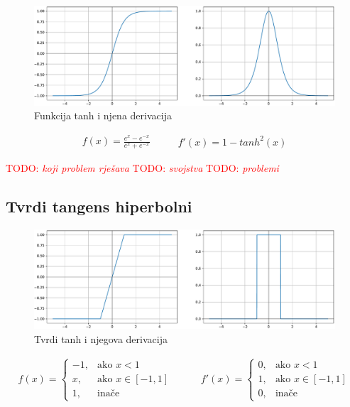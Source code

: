 \documentclass[times, utf8, diplomski]{fer}
\def\TODO#1{\noindent\textcolor{red}{TODO: \textit{#1}}\newline}
\def\todo#1{\TODO{#1}}
\begin{document}
\begin{figure}[H]
\includegraphics[width=\textwidth]{tanh.pdf}
\centering
\caption{Funkcija tanh i njena derivacija}
\label{fig:tanh}
\end{figure}

\begin{equation}
\begin{split}
f(x) = \frac{e^x - e^{-x}}{e^x + e^{-x}}
\end{split}
\qquad
\begin{split}
f'(x) = 1 - tanh^2(x)
\end{split}
\end{equation}

\todo{koji problem rješava}
\todo{svojstva}
\todo{problemi}

\subsection{Tvrdi tangens hiperbolni}

\begin{figure}[H]
\includegraphics[width=\textwidth]{Hard_tanh.pdf}
\centering
\caption{Tvrdi tanh i njegova derivacija}
\label{fig:hard_tanh}
\end{figure}

\begin{equation}
\begin{split}
f(x) =
\begin{cases}
-1,	 		& \text{ako } x < 1 \\
x,	 		& \text{ako } x \in [-1,1] \\
1,	& \text{inače}
\end{cases}
\end{split}
\qquad
\begin{split}
f'(x) =
\begin{cases}
0,	 		& \text{ako } x < 1 \\
1,	 		& \text{ako } x \in [-1,1] \\
0,	& \text{inače}
\end{cases}
\end{split}
\end{equation}
\end{document}
